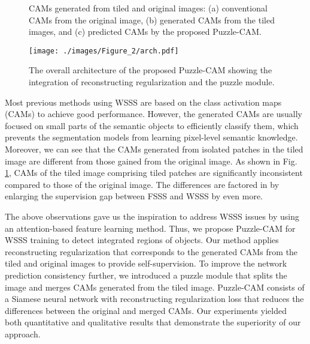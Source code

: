 \documentclass{article}
\begin{document}
\begin{figure}[t]
\centering
{}  \hspace{2mm}
 \hspace{2mm}
\caption{
CAMs generated from tiled and original images:
(a) conventional CAMs from the original image, (b) generated CAMs from the tiled images, and (c) predicted CAMs by the proposed Puzzle-CAM.
}
\label{fig:intro}
\end{figure}


\begin{figure*}[t]\centering \texttt{[image: ./images/Figure\_2/arch.pdf]}
\caption{
The overall architecture of the proposed Puzzle-CAM showing the integration of reconstructing regularization and the puzzle module.
}
\label{fig:full}
\end{figure*}

Most previous methods \cite{ahn2018learning, Wang_2020_CVPR, lee2019ficklenet} using WSSS are based on the class activation maps (CAMs) \cite{zhou2016learning} to achieve good performance.
However, the generated CAMs are usually focused on small parts of the semantic objects to efficiently classify them, which prevents the segmentation models from learning pixel-level semantic knowledge.
Moreover, we can see that the CAMs generated from isolated patches in the tiled image are different from those gained from the original image.
As shown in Fig. \ref{fig:intro}, CAMs of the tiled image comprising tiled patches are significantly inconsistent compared to those of the original image.
The differences are factored in by enlarging the supervision gap between FSSS and WSSS by even more.



The above observations gave us the inspiration to address WSSS issues by using an attention-based feature learning method.
Thus, we propose Puzzle-CAM for WSSS training to detect integrated regions of objects.
Our method applies reconstructing regularization that corresponds to the generated CAMs from the tiled and original images to provide self-supervision.
To improve the network prediction consistency further, we introduced a puzzle module that splits the image and merges CAMs generated from the tiled image.
Puzzle-CAM consists of a Siamese neural network with reconstructing regularization loss that reduces the differences between the original and merged CAMs.
Our experiments yielded both quantitative and qualitative results that demonstrate the superiority of our approach. 
\end{document}
